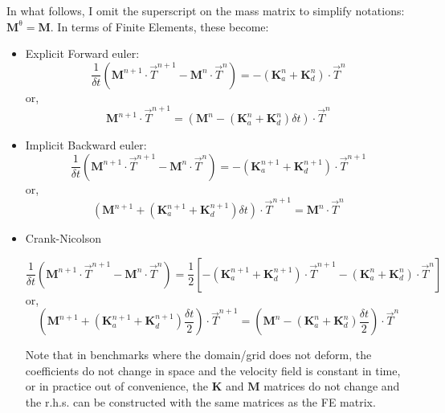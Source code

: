In what follows, I omit the superscript on the mass matrix to simplify notations: ${\bm M}^\uptheta={\bm M}$.
In terms of Finite Elements, these become:
\begin{itemize}
\item Explicit Forward euler:
\[
\frac{1}{\delta t} ({\bm M}^{n+1} \cdot \vec T^{n+1}  -{\bm M}^n \cdot \vec T^{n} )
=
-({\bm K}_a^n+{\bm K}^n_d) \cdot \vec T^{n}
\]
or, 
\[
\boxed{
{\bm M}^{n+1} \cdot \vec T^{n+1}
= \left(  {\bm M}^n  - ({\bm K}_a^n+{\bm K}_d^n) \delta t \right)\cdot \vec T^{n} 
}
\]

\item Implicit Backward euler:
\[
\frac{1}{\delta t} ({\bm M}^{n+1} \cdot \vec T^{n+1}  -{\bm M}^n \cdot \vec T^{n} )
= -({\bm K}_a^{n+1}+{\bm K}_d^{n+1}) \cdot \vec T^{n+1}
\]
or, 
\begin{equation}
\boxed{
\left( {\bm M}^{n+1} +({\bm K}_a^{n+1}+{\bm K}_d^{n+1})\delta t \right) \cdot \vec T^{n+1}
=
{\bm M}^n \cdot \vec T^{n} 
}
\label{eq:hte_ibe}
\end{equation}

\item Crank-Nicolson

\[
\frac{1}{\delta t} \left({\bm M}^{n+1} \cdot \vec T^{n+1}  -{\bm M}^n \cdot \vec T^{n} \right)
= 
\frac{1}{2}
\left[
-({\bm K}_a^{n+1}+{\bm K}_d^{n+1}) \cdot \vec T^{n+1}
-({\bm K}_a^{n}+{\bm K}_d^{n}) \cdot \vec T^{n}
\right]
\]
or,
\[
\boxed{
\left( {\bm M}^{n+1} +({\bm K}_a^{n+1}+{\bm K}_d^{n+1})\frac{\delta t}{2} \right) \cdot \vec T^{n+1}
= \left(  {\bm M}^n  - ({\bm K}_a^n+{\bm K}_d^n) \frac{\delta t}{2} \right)\cdot \vec T^{n} 
}
\]

Note that in benchmarks where the domain/grid does not deform, the coefficients do not change in space
and the velocity field is constant in time, or in practice out of convenience, the ${\bm K}$  and ${\bm M}$ 
matrices do not change and the r.h.s. can be constructed with the same matrices as the FE matrix.

\end{itemize}




